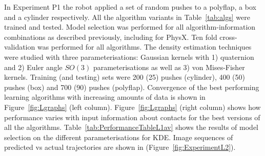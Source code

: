 In Experiment P1 the robot applied a set of random pushes to a
polyflap, a box and a cylinder respectively. All the algorithm
variants in Table~\ref{tab:algs} were trained and tested. Model
selection was performed for all algorithm-information combinations as
described previously, including for PhysX. Ten fold cross-validation
was performed for all algorithms. The density estimation techniques
were studied with three parameterisations: Gaussian kernels with 1)
quaternion and 2) Euler angle $SO(3)$ parameterisations as well as 3)
von Mises-Fisher kernels. Training (and testing) sets were 200 (25)
pushes (cylinder), 400 (50) pushes (box) and 700 (90) pushes
(polyflap). Convergence of the best performing learning algorithms
with increasing amounts of data is shown in Figure~\ref{fig:Lgraphs}
(left column). 
 Figure~\ref{fig:Lgraphs} (right column) shows how performance varies with input information about contacts for the best versions of all the algorithms.  Table~\ref{tab:PerformanceTableL1av} shows the results of model selection on the different parameterisations for KDE. Image sequences of predicted vs actual trajectories are shown in (Figure~\ref{fig:ExperimentL2}).

\newlength{\imgAXwid}
\setlength{\imgAXwid}{2.15cm}



